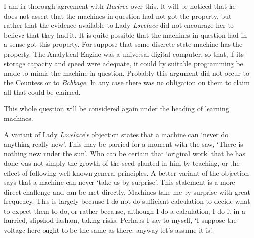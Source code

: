 \documentclass[10pt]{article} %
\begin{document}
I am in thorough agreement with \textit{Hartree} over this. It will be noticed that he does not assert that the machines in question had not got the property, but rather that the evidence available to Lady \textit{Lovelace} did not encourage her to believe that they had it. It is quite possible that the machines in question had in a sense got this property. For suppose that some discrete-state machine has the property. The Analytical Engine was a universal digital computer, so that, if its storage capacity and speed were adequate, it could by suitable programming be made to mimic the machine in question. Probably this argument did not occur to the Countess or to \textit{Babbage}. In any case there was no obligation on them to claim all that could be claimed.

This whole question will be considered again under the heading of learning machines.

A variant of Lady \textit{Lovelace}'s objection states that a machine can `never do anything really new'. This may be parried for a moment with the saw, `There is nothing new under the sun'. Who can be certain that `original work' that he has done was not simply the growth of the seed planted in him by teaching, or the effect of following well-known general principles. A better variant of the objection says that a machine can never `take us by surprise'. This statement is a more direct challenge and can be met directly. Machines take me by surprise with great frequency. This is largely because I do not do sufficient calculation to decide what to expect them to do, or rather because, although I do a calculation, I do it in a hurried, slipshod fashion, taking risks. Perhaps I say to myself, `I suppose the voltage here ought to be the same as there: anyway let's assume it is'.
\end{document}
